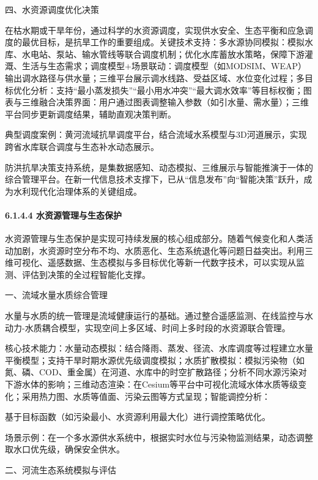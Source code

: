 四、水资源调度优化决策

在枯水期或干旱年份，通过科学的水资源调度，实现供水安全、生态平衡和应急调度的最优目标，是抗旱工作的重要组成。关键技术支持：多水源协同模拟：模拟水库、水电站、泵站、输水管线等联合调度机制；优化水库蓄放水策略，保障下游灌溉、生活与生态需求；调度模型+场景联动：调度模型（如MODSIM、WEAP）输出调水路径与供水量；三维平台展示调水线路、受益区域、水位变化过程；多目标优化分析：支持``最小蒸发损失''``最小用水冲突''``最大调水效率''等目标权衡；图表与三维融合决策界面：用户通过图表调整输入参数（如引水量、需水量）；三维平台同步更新调度结果，辅助直观决策判断。

典型调度案例：黄河流域抗旱调度平台，结合流域水系模型与3D河道展示，实现跨省水库联合调度与生态补水动态展示。

防洪抗旱决策支持系统，是集数据感知、动态模拟、三维展示与智能推演于一体的综合管理平台。在新一代信息技术支撑下，已从``信息发布''向``智能决策''跃升，成为水利现代化治理体系的关键组成。

\hypertarget{ux6c34ux8d44ux6e90ux7ba1ux7406ux4e0eux751fux6001ux4fddux62a4}{%
\paragraph{6.1.4.4 水资源管理与生态保护}\label{ux6c34ux8d44ux6e90ux7ba1ux7406ux4e0eux751fux6001ux4fddux62a4}}

水资源管理与生态保护是实现可持续发展的核心组成部分。随着气候变化和人类活动加剧，水资源时空分布不均、水质恶化、生态系统退化等问题日益突出。利用三维可视化、遥感数据、生态模拟与多目标优化等新一代数字技术，可以实现从监测、评估到决策的全过程智能化支撑。

一、流域水量水质综合管理

水量与水质的统一管理是流域健康运行的基础。通过整合遥感监测、在线监控与水动力-水质耦合模型，实现空间上多区域、时间上多时段的水资源联合管理。

核心技术能力：水量动态模拟：结合降雨、蒸发、径流、水库调度等过程建立水量平衡模型；支持干旱时期水源优先级调度模拟；水质扩散模拟：模拟污染物（如氮、磷、COD、重金属）在河道、水库中的时空扩散路径；分析不同水源污染对下游水体的影响；三维动态渲染：在Cesium等平台中可视化流域水体水质等级变化；采用热力图、水质等值面、污染云图等方式呈现；智能调控分析：

基于目标函数（如污染最小、水资源利用最大化）进行调控策略优化。

场景示例：在一个多水源供水系统中，根据实时水位与污染物监测结果，动态调整取水口优先级，确保安全供水。

二、河流生态系统模拟与评估

